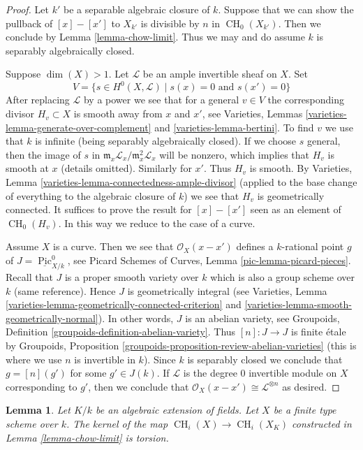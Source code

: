 \documentclass{stacks-project}
\theoremstyle{plain}
\newtheorem{lemma}[subsection]{Lemma}
\theoremstyle{definition}
\theoremstyle{remark}
\numberwithin{equation}{subsection}
\def\CH{\mathop{\mathrm{CH}}\nolimits}
\def\Pic{\mathop{\mathrm{Pic}}\nolimits}
\begin{document}
\begin{proof}
Let $k'$ be a separable algebraic closure of $k$. Suppose that we can show
the pullback of $[x] - [x']$ to $X_{k'}$ is divisible by $n$ in
$\CH_0(X_{k'})$. Then we conclude by Lemma \ref{lemma-chow-limit}.
Thus we may and do assume $k$ is separably algebraically closed.

\medskip\noindent
Suppose $\dim(X) > 1$. Let $\mathcal{L}$ be an ample invertible sheaf on $X$.
Set
$$
V = \{s \in H^0(X, \mathcal{L}) \mid s(x) = 0\text{ and }s(x') = 0 \}
$$
After replacing $\mathcal{L}$ by a power we see that for
a general $v \in V$ the corresponding divisor $H_v \subset X$ is smooth
away from $x$ and $x'$, see
Varieties, Lemmas \ref{varieties-lemma-generate-over-complement} and
\ref{varieties-lemma-bertini}. To find $v$ we use that $k$ is infinite (being
separably algebraically closed).
If we choose $s$ general, then the image of $s$ in
$\mathfrak m_x\mathcal{L}_x/\mathfrak m_x^2\mathcal{L}_x$
will be nonzero, which implies that $H_v$ is smooth at $x$
(details omitted). Similarly for $x'$. Thus $H_v$ is smooth.
By Varieties, Lemma \ref{varieties-lemma-connectedness-ample-divisor}
(applied to the base change of everything
to the algebraic closure of $k$)
we see that $H_v$ is geometrically connected.
It suffices to prove the result for
$[x] - [x']$ seen as an element of $\CH_0(H_v)$.
In this way we reduce to the case of a curve.

\medskip\noindent
Assume $X$ is a curve. Then we see that $\mathcal{O}_X(x - x')$
defines a $k$-rational point $g$ of $J = \underline{\Pic}^0_{X/k}$, see
Picard Schemes of Curves, Lemma \ref{pic-lemma-picard-pieces}.
Recall that $J$ is a proper smooth variety over $k$
which is also a group scheme over $k$ (same reference).
Hence $J$ is geometrically integral
(see Varieties, Lemma \ref{varieties-lemma-geometrically-connected-criterion}
and \ref{varieties-lemma-smooth-geometrically-normal}).
In other words, $J$ is an abelian variety, see
Groupoids, Definition \ref{groupoids-definition-abelian-variety}.
Thus $[n] : J \to J$ is finite \'etale by
Groupoids, Proposition \ref{groupoids-proposition-review-abelian-varieties}
(this is where we use $n$ is invertible in $k$).
Since $k$ is separably closed we conclude that $g = [n](g')$
for some $g' \in J(k)$. If $\mathcal{L}$ is the degree $0$
invertible module on $X$ corresponding to $g'$, then we conclude
that $\mathcal{O}_X(x - x') \cong \mathcal{L}^{\otimes n}$ as desired.
\end{proof}

\begin{lemma}
\label{lemma-kernel-to-closure}
Let $K/k$ be an algebraic extension of fields.
Let $X$ be a finite type scheme over $k$.
The kernel of the map $\CH_i(X) \to \CH_i(X_K)$
constructed in Lemma \ref{lemma-chow-limit}
is torsion.
\end{lemma}
\end{document}
